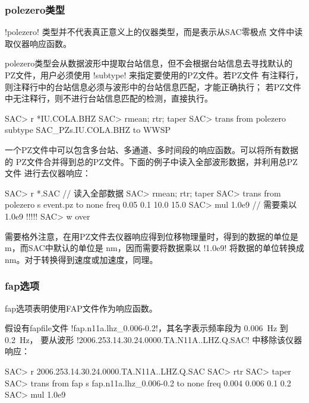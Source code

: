 \subsubsection{polezero类型}
!polezero! 类型并不代表真正意义上的仪器类型，而是表示从SAC零极点
文件中读取仪器响应函数。

polezero类型会从数据波形中提取台站信息，但不会根据台站信息去寻找默认的
PZ文件，用户必须使用 !subtype! 来指定要使用的PZ文件。若PZ文件
有注释行，则注释行中的台站信息必须与波形中的台站信息匹配，才能正确执行；
若PZ文件中无注释行，则不进行台站信息匹配的检测，直接执行。
\begin{SACCode}
SAC> r *IU.COLA.BHZ
SAC> rmean; rtr; taper
SAC> trans from polezero subtype SAC_PZs.IU.COLA.BHZ to WWSP
\end{SACCode}

一个PZ文件中可以包含多台站、多通道、多时间段的响应函数。可以将所有数据的
PZ文件合并得到总的PZ文件。下面的例子中读入全部波形数据，并利用总PZ文件
进行去仪器响应：
\begin{SACCode}
SAC> r *.SAC          // 读入全部数据
SAC> rmean; rtr; taper
SAC> trans from polezero s event.pz to none freq 0.05 0.1 10.0 15.0
SAC> mul 1.0e9        // 需要乘以1.0e9 !!!!!
SAC> w over
\end{SACCode}

需要格外注意，在用PZ文件去仪器响应得到位移物理量时，得到的数据的单位是
\si{m}，而SAC中默认的单位是 \si{nm}，因而需要将数据乘以 !1.0e9!
将数据的单位转换成 \si{nm}。对于转换得到速度或加速度，同理。

\subsubsection{fap选项}
fap选项表明使用FAP文件作为响应函数。

假设有fapfile文件 !fap.n11a.lhz_0.006-0.2!，其名字表示频率段为
\SI{0.006}{\Hz} 到 \SI{0.2}{\Hz}，
要从波形 !2006.253.14.30.24.0000.TA.N11A..LHZ.Q.SAC! 中移除该仪器响应：
\begin{SACCode}
SAC> r 2006.253.14.30.24.0000.TA.N11A..LHZ.Q.SAC
SAC> rtr
SAC> taper
SAC> trans from fap s fap.n11a.lhz_0.006-0.2 to none freq 0.004 0.006 0.1 0.2
SAC> mul 1.0e9
\end{SACCode}
